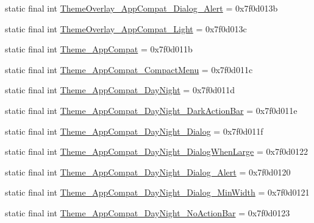 \begin{DoxyCompactItemize}
\item 
static final int \mbox{\hyperlink{classandroid_1_1support_1_1design_1_1R_1_1style_a65b40e6a0cde1145b8fe60d0be10292d}{Theme\+Overlay\+\_\+\+App\+Compat\+\_\+\+Dialog\+\_\+\+Alert}} = 0x7f0d013b
\item 
static final int \mbox{\hyperlink{classandroid_1_1support_1_1design_1_1R_1_1style_ae7401b46ade43c0f9362b4284f5ea048}{Theme\+Overlay\+\_\+\+App\+Compat\+\_\+\+Light}} = 0x7f0d013c
\item 
static final int \mbox{\hyperlink{classandroid_1_1support_1_1design_1_1R_1_1style_a47abe16cf2c44a07f0ea97b28021e096}{Theme\+\_\+\+App\+Compat}} = 0x7f0d011b
\item 
static final int \mbox{\hyperlink{classandroid_1_1support_1_1design_1_1R_1_1style_af28bb64d8932aa6cd8d8b7c0dce5dc85}{Theme\+\_\+\+App\+Compat\+\_\+\+Compact\+Menu}} = 0x7f0d011c
\item 
static final int \mbox{\hyperlink{classandroid_1_1support_1_1design_1_1R_1_1style_a700fdd059b4bd7eb2b2e636cd4a323de}{Theme\+\_\+\+App\+Compat\+\_\+\+Day\+Night}} = 0x7f0d011d
\item 
static final int \mbox{\hyperlink{classandroid_1_1support_1_1design_1_1R_1_1style_a5eb940eb578df92cfd2b8bb1b6d3aee3}{Theme\+\_\+\+App\+Compat\+\_\+\+Day\+Night\+\_\+\+Dark\+Action\+Bar}} = 0x7f0d011e
\item 
static final int \mbox{\hyperlink{classandroid_1_1support_1_1design_1_1R_1_1style_a438591c36b44ecebfae3881c33ef57b7}{Theme\+\_\+\+App\+Compat\+\_\+\+Day\+Night\+\_\+\+Dialog}} = 0x7f0d011f
\item 
static final int \mbox{\hyperlink{classandroid_1_1support_1_1design_1_1R_1_1style_ad3e986a7ecad49e4aa2b683263281a2e}{Theme\+\_\+\+App\+Compat\+\_\+\+Day\+Night\+\_\+\+Dialog\+When\+Large}} = 0x7f0d0122
\item 
static final int \mbox{\hyperlink{classandroid_1_1support_1_1design_1_1R_1_1style_a817ac42257661b14c85637671bbfb502}{Theme\+\_\+\+App\+Compat\+\_\+\+Day\+Night\+\_\+\+Dialog\+\_\+\+Alert}} = 0x7f0d0120
\item 
static final int \mbox{\hyperlink{classandroid_1_1support_1_1design_1_1R_1_1style_a0ff3354e007d5bf0f33b51169db2d927}{Theme\+\_\+\+App\+Compat\+\_\+\+Day\+Night\+\_\+\+Dialog\+\_\+\+Min\+Width}} = 0x7f0d0121
\item 
static final int \mbox{\hyperlink{classandroid_1_1support_1_1design_1_1R_1_1style_abd2683624e794ff36ad8f50ee4721add}{Theme\+\_\+\+App\+Compat\+\_\+\+Day\+Night\+\_\+\+No\+Action\+Bar}} = 0x7f0d0123
\item 

\end{DoxyCompactItemize}
